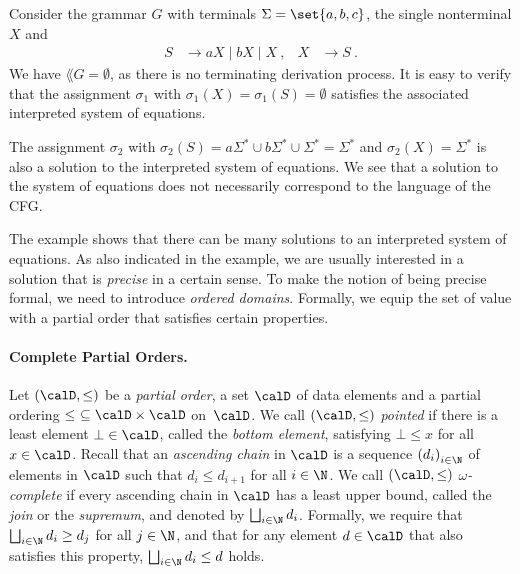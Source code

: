 \documentclass[../../diss.tex]{subfiles}
\begin{document}
\begin{example}%
\label{Example:EDSSysOfEqCFG}%
    Consider the grammar $G$ with terminals $\Sigma = \set{a ,b, c}$, the single nonterminal $X$ and 
    \begin{align*}
        S &\to aX \mid bX \mid X
        \ ,
        &
        X &\to S
        \ .
    \end{align*}
    We have $\lang{G} = \emptyset$, as there is no terminating derivation process.
    It is easy to verify that the assignment $\sigma_1$ with $\sigma_1(X) = \sigma_1(S) = \emptyset$ satisfies the associated interpreted system of equations.

    The assignment $\sigma_2$ with $\sigma_2(S) = a\Sigma^* \cup b\Sigma^* \cup \Sigma^* = \Sigma^*$ and $\sigma_2(X) = \Sigma^*$ is also a solution to the interpreted system of equations.
    We see that a solution to the system of equations does not necessarily correspond to the language of the CFG.\@
\end{example}

The example shows that there can be many solutions to an interpreted system of equations.
As also indicated in the example, we are usually interested in a solution that is \emph{precise} in a certain sense.
To make the notion of being precise formal, we need to introduce \emph{ordered domains}.
Formally, we equip the set of value with a partial order that satisfies certain properties.

\paragraph{Complete Partial Orders.}


Let $(\domain, \leq)$ be a \emph{partial order}, \ie a set $\domain$ of data elements and a partial ordering $\leq \ \subseteq \domain \times \domain$ on~$\domain$.
We call $(\domain, \leq)$ \emph{pointed} if there is a least element $\bot \in \domain$, called the \emph{bottom element}, satisfying $\bot \leq x$ for all $x \in \domain$.
%
Recall that an \emph{ascending chain} in $\domain$ is a sequence ${(d_i)}_{i \in \N}$ of elements in $\domain$ such that $d_i \leq d_{i+1}$ for all $i \in \N$.
We call $(\domain, \leq)$ \emph{$\omega$-complete} if every ascending chain in $\domain$ has a least upper bound, called the \emph{join} or the \emph{supremum}, and denoted by $\bigsqcup_{i \in  \N} d_i$.
Formally, we require that $\bigsqcup_{i \in  \N} d_i \geq d_j$ for all $j \in  \N$, and that for any element $d \in \domain$ that also satisfies this property, $\bigsqcup_{i \in  \N} d_i \leq d$ holds.
\end{document}
